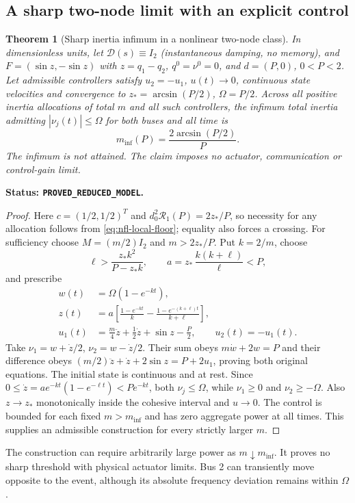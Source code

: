 \documentclass[11pt]{article}
\newtheorem{theorem}{Theorem}
\newcommand{\status}[1]{\par\smallskip\noindent\textbf{Status: \texttt{#1}.}\ }
\begin{document}
\subsection{A sharp two-node limit with an explicit control}
\begin{theorem}[Sharp inertia infimum in a nonlinear two-node class]
In dimensionless units, let $\mathcal D(s)\equiv I_2$ (instantaneous damping,
no memory), and $F=(\sin z,-\sin z)$ with
$z=q_1-q_2$, $q^0=\nu^0=0$, and $d=(P,0)$, $0<P<2$.
Let admissible controllers satisfy $u_2=-u_1$, $u(t)\to0$,
continuous state velocities and convergence to
$z_*=\arcsin(P/2)$, $\Omega=P/2$.
Across all positive inertia allocations of total $m$ and all such
controllers, the infimum total inertia admitting
$|\nu_j(t)|\leq\Omega$ for both buses and all time is
\begin{equation}
 \boxed{m_{\inf}(P)=\frac{2\arcsin(P/2)}{P}.}
 \label{eq:nfl-sharp}
\end{equation}
The infimum is not attained. The claim imposes no actuator, communication
or control-gain limit.
\end{theorem}
\status{PROVED\_REDUCED\_MODEL}
\begin{proof}
Here $c=(1/2,1/2)^T$ and
$d_0^2\mathcal R_1(P)=2z_*/P$, so necessity for any allocation follows
from \eqref{eq:nfl-local-floor}; equality also forces a crossing.
For sufficiency choose $M=(m/2)I_2$ and $m>2z_*/P$.
Put $k=2/m$, choose
\[
 \ell>\frac{z_*k^2}{P-z_*k},\qquad
 a=z_*\,\frac{k(k+\ell)}{\ell}<P,
\]
and prescribe
\begin{align}
 w(t)&=\Omega(1-e^{-kt}),\\
 z(t)&=a\left[\frac{1-e^{-kt}}{k}
                    -\frac{1-e^{-(k+\ell)t}}{k+\ell}\right],\\
 u_1(t)&=\frac m4\ddot z+\frac12\dot z+\sin z-\frac P2,\qquad
 u_2(t)=-u_1(t). \label{eq:nfl-construction}
\end{align}
Take $\nu_1=w+\dot z/2$, $\nu_2=w-\dot z/2$.
Their sum obeys $m\dot w+2w=P$ and their difference obeys
$(m/2)\ddot z+\dot z+2\sin z=P+2u_1$, proving both original equations.
The initial state is continuous and at rest.
Since $0\leq\dot z=a e^{-kt}(1-e^{-\ell t})<P e^{-kt}$,
both $\nu_j\leq\Omega$, while $\nu_1\geq0$ and $\nu_2\geq-\Omega$.
Also $z\to z_*$ monotonically inside the cohesive interval and $u\to0$.
The control is bounded for each fixed $m>m_{\inf}$ and has zero aggregate
power at all times. This supplies an admissible construction for every
strictly larger $m$.
\end{proof}
The construction can require arbitrarily large power as $m\downarrow
m_{\inf}$. It proves no sharp threshold with physical actuator limits.
Bus 2 can transiently move opposite to the event, although its absolute
frequency deviation remains within $\Omega$.
\end{document}
